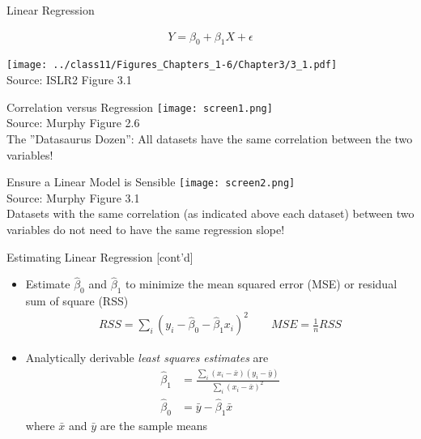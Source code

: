 \documentclass[ignorenonframetext,xcolor=x11names]{beamer}
\begin{document}
\begin{frame}{Linear Regression}

\begin{align*}
Y = \beta_0 + \beta_1 X + \epsilon
\end{align*}

\centering

\texttt{[image: ../class11/Figures\_Chapters\_1-6/Chapter3/3\_1.pdf]} \\

\scriptsize Source: ISLR2 Figure 3.1
\end{frame}

\begin{frame}{Correlation versus Regression}
\centering
\texttt{[image: screen1.png]} \\

\scriptsize Source: Murphy Figure 2.6 \\ \vspace{3mm}
\normalsize
The ''Datasaurus Dozen'': All datasets have the same correlation between the two variables!
\end{frame}

\begin{frame}{Ensure a Linear Model is Sensible}
\centering
\texttt{[image: screen2.png]} \\

\scriptsize Source: Murphy Figure 3.1 \\ \vspace{3mm}
\normalsize
Datasets with the same correlation (as indicated above each dataset) between two variables do not need to have the same regression slope!
\end{frame}


\begin{frame}{Estimating Linear Regression \small [cont'd]}
\begin{itemize}
  \item Estimate $\hat{\beta}_0$ and $\hat{\beta}_1$ to minimize the mean squared error (MSE) or residual sum of square (RSS)
\begin{align*}
RSS = \sum_i \left( y_i - \hat{\beta}_0 - \hat{\beta}_1 x_i \right)^2 \quad \quad MSE = \frac{1}{n} RSS
\end{align*}
  \item Analytically derivable \emph{least squares estimates} are
\begin{align*}
\hat{\beta}_1 &= \frac{\sum_i (x_i - \bar{x})(y_i - \bar{y})} {\sum_i (x_i - \bar{x})^2} \\
\hat{\beta}_0 &= \bar{y} - \hat{\beta}_1 \bar{x}
\end{align*}
where $\bar{x}$ and $\bar{y}$ are the sample means
\end{itemize}
\end{frame}
\end{document}
